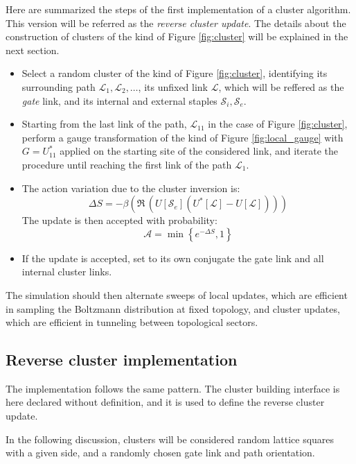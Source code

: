 Here are summarized the steps of the first implementation of a cluster algorithm.
This version will be referred as the \emph{reverse cluster update}.
The details about the construction of clusters of the kind of Figure \ref{fig:cluster}
will be explained in the next section.

\begin{itemize}
    \item
        Select a random cluster of the kind of Figure \ref{fig:cluster},
        identifying its surrounding path $\mathcal L_1, \mathcal L_2, \ldots$,
        its unfixed link $\mathcal L$, which will be reffered as the \emph{gate} link,
        and its internal and external staples $\mathcal S_i, \mathcal S_e$.
    \item 
        Starting from the last link of the path,
        $\mathcal L_{11}$ in the case of Figure \ref{fig:cluster},
        perform a gauge transformation of the kind of Figure \ref{fig:local_gauge}
        with $G=U^*_{11}$ applied on the starting site of the considered link,
        and iterate the procedure until reaching the first link of the path $\mathcal L_1$.
    \item
        The action variation due to the cluster inversion is:
        \[
            \Delta S = -\beta(\Re\,(U[\mathcal S_e](U^*[\mathcal L]-U[\mathcal L])))
        \]
        The update is then accepted with probability:
        \[
            \mathcal A = \min\left\{e^{-\Delta S},1\right\}
        \]
    \item 
        If the update is accepted,
        set to its own conjugate the gate link and all internal cluster links.
\end{itemize}

The simulation should then alternate sweeps of local updates,
which are efficient in sampling the Boltzmann distribution at fixed topology,
and cluster updates, which are efficient in tunneling between topological sectors.

\subsection{Reverse cluster implementation}
The implementation follows the same pattern.
The cluster building interface is here declared without definition,
and it is used to define the reverse cluster update.

In the following discussion,
clusters will be considered random lattice squares with a given side,
and a randomly chosen gate link and path orientation.

